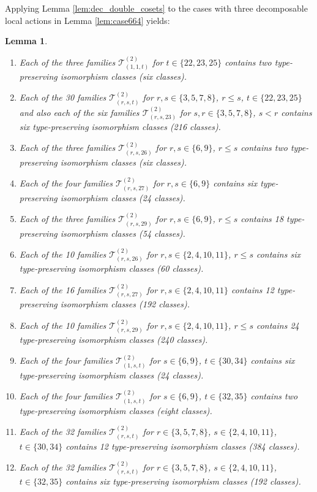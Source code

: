 \documentclass[dvipsnames]{article}
\newtheorem{lemma}[theorem]{Lemma}
\theoremstyle{definition}
\theoremstyle{remark}
\begin{document}
    Applying Lemma \ref{lem:dec_double_cosets} to the cases with three decomposable local actions in Lemma \ref{lem:case664} yields:
    \begin{lemma}\label{lem:dec_664}
        \begin{enumerate}
            \item Each of the three families $\mathcal T_{(1,1,t)}^{(2)}$ for $t\in \{22,23,25\}$ contains two type-preserving isomorphism classes (six classes).
            \item Each of the 30 families $\mathcal T_{(r,s,t)}^{(2)}$ for $r,s \in \{3,5,7,8\}$, $r\leq s$, $t\in \{22,23,25\}$ and also each of the six families $\mathcal T_{(r,s,23)}^{(2)}$ for $s,r \in\{3,5,7,8\}$, $s<r$ contains six type-preserving isomorphism classes (216 classes).
            \item Each of the three families $\mathcal T_{(r,s,26)}^{(2)}$ for $r,s \in \{6,9\}$, $r\leq s$ contains two type-preserving isomorphism classes (six classes).
            \item Each of the four families $\mathcal T_{(r,s,27)}^{(2)}$ for $r,s \in \{6,9\}$ contains six type-preserving isomorphism classes (24 classes).
            \item Each of the three families $\mathcal T_{(r,s,29)}^{(2)}$ for $r,s \in \{6,9\}$, $r\leq s$ contains 18 type-preserving isomorphism classes (54 classes).
            \item Each of the 10 families $\mathcal T_{(r,s,26)}^{(2)}$ for $r,s \in \{2,4,10,11\}$, $r\leq s$ contains six type-preserving isomorphism classes (60 classes).
            \item Each of the 16 families $\mathcal T_{(r,s,27)}^{(2)}$ for $r, s \in \{2,4,10,11\}$ contains 12 type-preserving isomorphism classes (192 classes).
            \item Each of the 10 families $\mathcal T_{(r,s,29)}^{(2)}$ for $r,s \in \{2,4,10,11\}$, $r\leq s$ contains 24 type-preserving isomorphism classes (240 classes).
            \item Each of the four families $\mathcal T_{(1,s,t)}^{(2)}$ for $s \in \{6,9\}$, $t\in \{30,34\}$ contains six type-preserving isomorphism classes (24 classes).
            \item Each of the four families $\mathcal T_{(1,s,t)}^{(2)}$ for $s \in \{6,9\}$, $t\in \{32,35\}$ contains two type-preserving isomorphism classes (eight classes).
            \item Each of the 32 families $\mathcal T_{(r,s,t)}^{(2)}$ for $r \in \{3,5,7,8\}$, $s\in \{2,4,10,11\}$, $t\in \{30,34\}$ contains 12 type-preserving isomorphism classes (384 classes).
            \item Each of the 32 families $\mathcal T_{(r,s,t)}^{(2)}$ for $r \in \{3,5,7,8\}$, $s\in \{2,4,10,11\}$, $t\in \{32,35\}$ contains six type-preserving isomorphism classes (192 classes).
        \end{enumerate}
    \end{lemma}
\end{document}
